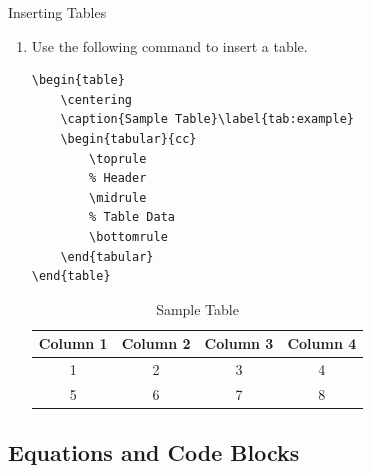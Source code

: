 \documentclass[8pt]{beamer}
\begin{document}
\begin{frame}[fragile]{\insertsection}{\insertsubsection}

    \begin{block}{Inserting Tables}
        \begin{enumerate}
            \item Use the following command to insert a table.
        \begin{lstlisting}[style=latex]
\begin{table}
    \centering
    \caption{Sample Table}\label{tab:example}
    \begin{tabular}{cc}
        \toprule
        % Header
        \midrule
        % Table Data
        \bottomrule
    \end{tabular}
\end{table}
        \end{lstlisting}

        \begin{table}
            \centering
            \caption{Sample Table}\label{tab:example}
            \begin{tabular}{cccc}
                \toprule
                Column 1 & Column 2 & Column 3 & Column 4 \\
                \midrule
                1 & 2 & 3 & 4 \\
                5 & 6 & 7 & 8 \\
                \bottomrule
            \end{tabular}
        \end{table}
        \end{enumerate}
    \end{block}
\end{frame}


\subsection{Equations and Code Blocks}
\end{document}
